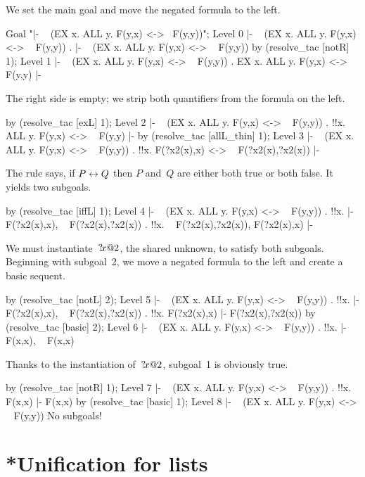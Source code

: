 We set the main goal and move the negated formula to the left.
\begin{ttbox}
Goal "|- ~ (EX x. ALL y. F(y,x) <-> ~F(y,y))";
{\out Level 0}
{\out  |- ~ (EX x. ALL y. F(y,x) <-> ~ F(y,y))}
{.  |- ~ (EX x. ALL y. F(y,x) <-> ~ F(y,y))}
by (resolve_tac [notR] 1);
{\out Level 1}
{\out  |- ~ (EX x. ALL y. F(y,x) <-> ~ F(y,y))}
{. EX x. ALL y. F(y,x) <-> ~ F(y,y) |-}
\end{ttbox}
The right side is empty; we strip both quantifiers from the formula on the
left.
\begin{ttbox}
by (resolve_tac [exL] 1);
{\out Level 2}
{\out  |- ~ (EX x. ALL y. F(y,x) <-> ~ F(y,y))}
{. !!x. ALL y. F(y,x) <-> ~ F(y,y) |-}
by (resolve_tac [allL_thin] 1);
{\out Level 3}
{\out  |- ~ (EX x. ALL y. F(y,x) <-> ~ F(y,y))}
{. !!x. F(?x2(x),x) <-> ~ F(?x2(x),?x2(x)) |-}
\end{ttbox}
The rule  says, if $P\leftrightarrow Q$ then $P$ and~$Q$ are either
both true or both false.  It yields two subgoals.
\begin{ttbox}
by (resolve_tac [iffL] 1);
{\out Level 4}
{\out  |- ~ (EX x. ALL y. F(y,x) <-> ~ F(y,y))}
{. !!x.  |- F(?x2(x),x), ~ F(?x2(x),?x2(x))}
{. !!x. ~ F(?x2(x),?x2(x)), F(?x2(x),x) |-}
\end{ttbox}
We must instantiate~${?\!x@2}$, the shared unknown, to satisfy both
subgoals.  Beginning with subgoal~2, we move a negated formula to the left
and create a basic sequent.
\begin{ttbox}
by (resolve_tac [notL] 2);
{\out Level 5}
{\out  |- ~ (EX x. ALL y. F(y,x) <-> ~ F(y,y))}
{. !!x.  |- F(?x2(x),x), ~ F(?x2(x),?x2(x))}
{. !!x. F(?x2(x),x) |- F(?x2(x),?x2(x))}
by (resolve_tac [basic] 2);
{\out Level 6}
{\out  |- ~ (EX x. ALL y. F(y,x) <-> ~ F(y,y))}
{. !!x.  |- F(x,x), ~ F(x,x)}
\end{ttbox}
Thanks to the instantiation of~${?\!x@2}$, subgoal~1 is obviously true.
\begin{ttbox}
by (resolve_tac [notR] 1);
{\out Level 7}
{\out  |- ~ (EX x. ALL y. F(y,x) <-> ~ F(y,y))}
{. !!x. F(x,x) |- F(x,x)}
by (resolve_tac [basic] 1);
{\out Level 8}
{\out  |- ~ (EX x. ALL y. F(y,x) <-> ~ F(y,y))}
{\out No subgoals!}
\end{ttbox}

\section{*Unification for lists}\label{sec:assoc-unification}

